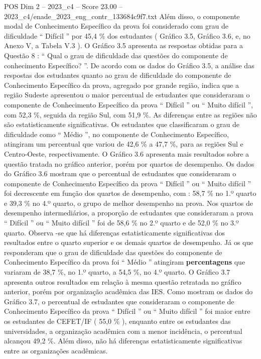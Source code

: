 \begin{textsample}{POS Dim 2 – 2023\_c4 – Score 23.00 – 2023\_c4/enade\_2023\_eng\_contr\_133684c9f7.txt}
Além disso, o componente modal de Conhecimento Específico da prova foi considerado com grau de dificuldade “ Difícil ” por 45,4 \% dos estudantes ( Gráfico 3.5, Gráfico 3.6, e, no Anexo V, a Tabela V.3 ).
O Gráfico 3.5 apresenta as respostas obtidas para a Questão 8 : “ Qual o grau de dificuldade das questões do componente de conhecimento Específico? ”.
De acordo com os dados do Gráfico 3.5, a análise das respostas dos estudantes quanto ao grau de dificuldade do componente de Conhecimento Específico da prova, agregado por grande região, indica que a região Sudeste apresentou o maior percentual de estudantes que consideraram o componente de Conhecimento Específico da prova “ Difícil ” ou “ Muito difícil ”, com 52,3 \%, seguida da região Sul, com 51,9 \%.
As diferenças entre as regiões não são estatisticamente significativas.
Os estudantes que classificaram o grau de dificuldade como “ Médio ”, no componente de Conhecimento Específico, atingiram um percentual que variou de 42,6 \% a 47,7 \%, para as regiões Sul e Centro-Oeste, respectivamente.
O Gráfico 3.6 apresenta mais resultados sobre a questão tratada no gráfico anterior, porém por quartos de desempenho.
Os dados do Gráfico 3.6 mostram que o percentual de estudantes que consideraram o componente de Conhecimento Específico da prova “ Difícil ” ou “ Muito difícil ” foi decrescente em função dos quartos de desempenho, com : 58,7 \% no 1.º quarto e 39,3 \% no 4.º quarto, o grupo de melhor desempenho na prova.
Nos quartos de desempenho intermediários, a proporção de estudantes que consideraram a prova “ Difícil ” ou “ Muito difícil ” foi de 58,6 \% no 2.º quarto e de 52,0 \% no 3.º quarto.
Observa -se que há diferenças estatisticamente significativas dos resultados entre o quarto superior e os demais quartos de desempenho.
Já os que responderam que o grau de dificuldade das questões do componente de Conhecimento Específico da prova foi “ Médio ” atingiram \textbf{percentagens} que variaram de 38,7 \%, no 1.º quarto, a 54,5 \%, no 4.º quarto.
O Gráfico 3.7 apresenta outros resultados em relação à mesma questão retratada no gráfico anterior, porém por organização acadêmica das IES.
Como mostram os dados do Gráfico 3.7, o percentual de estudantes que consideraram o componente de Conhecimento Específico da prova “ Difícil ” ou “ Muito difícil ” foi maior entre os estudantes de CEFET/IF ( 55,0 \% ), enquanto entre os estudantes das universidades, a organização acadêmica com a menor incidência, o percentual alcançou 49,2 \%.
Além disso, não há diferenças estatisticamente significativas entre as organizações acadêmicas.

\end{textsample}
